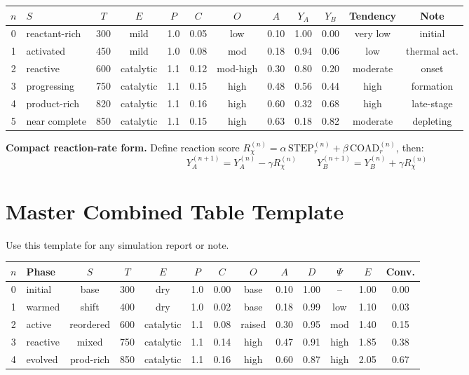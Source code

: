 \documentclass[11pt, letterpaper]{article}
\newcommand{\STEPr}{\mathrm{STEP}_r}
\newcommand{\COADr}{\mathrm{COAD}_r}
\begin{document}
\bigskip
\noindent
\begin{tabular}{@{}clcccccccccc@{}}
\toprule
$n$ & $S$ & $T$ & $E$ & $P$ & $C$ & $O$ & $A$ & $Y_A$ & $Y_B$ & Tendency & Note \\
\midrule
0 & reactant-rich & 300 & mild      & 1.0 & 0.05 & low & 0.10 & 1.00 & 0.00 & very low & initial \\
1 & activated     & 450 & mild      & 1.0 & 0.08 & mod & 0.18 & 0.94 & 0.06 & low      & thermal act. \\
2 & reactive      & 600 & catalytic & 1.1 & 0.12 & mod-high & 0.30 & 0.80 & 0.20 & moderate & onset \\
3 & progressing   & 750 & catalytic & 1.1 & 0.15 & high & 0.48 & 0.56 & 0.44 & high     & formation \\
4 & product-rich  & 820 & catalytic & 1.1 & 0.16 & high & 0.60 & 0.32 & 0.68 & high     & late-stage \\
5 & near complete & 850 & catalytic & 1.1 & 0.15 & high & 0.63 & 0.18 & 0.82 & moderate & depleting \\
\bottomrule
\end{tabular}

\medskip\noindent
\textbf{Compact reaction-rate form.}
Define reaction score $R_\chi^{(n)} = \alpha\,\STEPr^{(n)} + \beta\,\COADr^{(n)}$, then:
\[
Y_A^{(n+1)} = Y_A^{(n)} - \gamma R_\chi^{(n)}
\qquad
Y_B^{(n+1)} = Y_B^{(n)} + \gamma R_\chi^{(n)}
\]

\section{Master Combined Table Template}

\noindent
Use this template for any simulation report or note.

\bigskip
\noindent
\begin{tabular}{@{}clccccccccccc@{}}
\toprule
$n$ & Phase & $S$ & $T$ & $E$ & $P$ & $C$ & $O$ & $A$ & $D$ & $\Psi$ & $E$ & Conv. \\
\midrule
0 & initial   & base      & 300 & dry       & 1.0 & 0.00 & base & 0.10 & 1.00 & -- & 1.00 & 0.00 \\
1 & warmed    & shift     & 400 & dry       & 1.0 & 0.02 & base & 0.18 & 0.99 & low & 1.10 & 0.03 \\
2 & active    & reordered & 600 & catalytic & 1.1 & 0.08 & raised & 0.30 & 0.95 & mod & 1.40 & 0.15 \\
3 & reactive  & mixed     & 750 & catalytic & 1.1 & 0.14 & high & 0.47 & 0.91 & high & 1.85 & 0.38 \\
4 & evolved   & prod-rich & 850 & catalytic & 1.1 & 0.16 & high & 0.60 & 0.87 & high & 2.05 & 0.67 \\
\bottomrule
\end{tabular}
\end{document}
